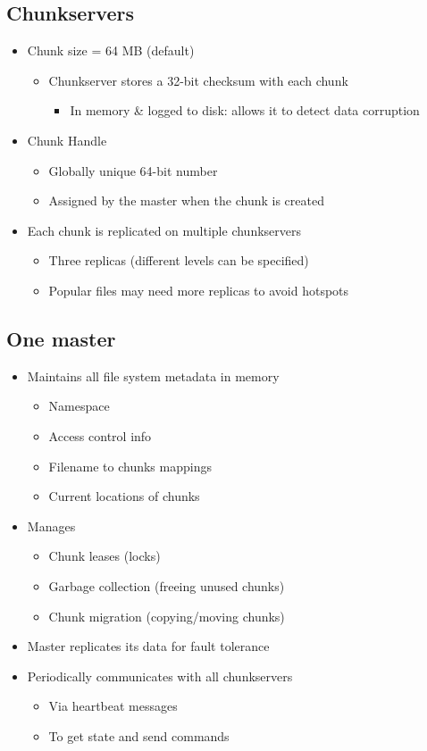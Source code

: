 \subsection{Chunkservers}
\begin{itemize}
  \item Chunk size = 64 MB (default)
  \begin{itemize}
    \item Chunkserver stores a 32-bit checksum with each chunk
    \begin{itemize}
      \item In memory \& logged to disk: allows it to detect data corruption
    \end{itemize}
  \end{itemize}
  \item Chunk Handle
  \begin{itemize}
    \item Globally unique 64-bit number
    \item Assigned by the master when the chunk is created
  \end{itemize}
  \item Each chunk is replicated on multiple chunkservers
  \begin{itemize}
    \item Three replicas (different levels can be specified)
    \item Popular files may need more replicas to avoid hotspots
  \end{itemize}
\end{itemize}

\subsection{One master}
\begin{itemize}
  \item Maintains all file system metadata in memory
  \begin{itemize}
    \item Namespace
    \item Access control info
    \item Filename to chunks mappings
    \item Current locations of chunks
  \end{itemize}
  \item Manages
  \begin{itemize}
    \item Chunk leases (locks)
    \item Garbage collection (freeing unused chunks)
    \item Chunk migration (copying/moving chunks)
  \end{itemize}
  \item Master replicates its data for fault tolerance
  \item Periodically communicates with all chunkservers
  \begin{itemize}
    \item Via heartbeat messages
    \item To get state and send commands
  \end{itemize}
\end{itemize}

